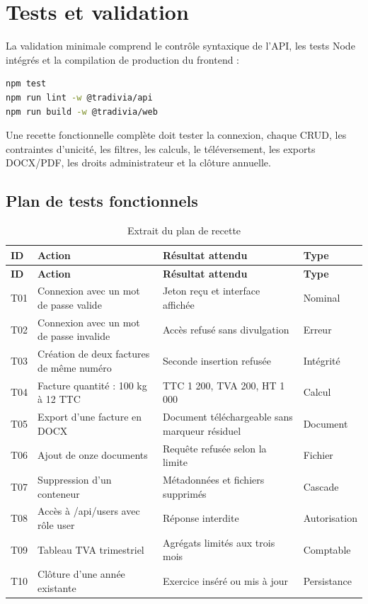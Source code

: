 \documentclass[12pt,a4paper,oneside]{report}
\begin{document}
\section{Tests et validation}
La validation minimale comprend le contrôle syntaxique de l'API, les tests Node intégrés et la compilation de production du frontend :
\begin{lstlisting}[language=bash,caption={Commandes de validation}]
npm test
npm run lint -w @tradivia/api
npm run build -w @tradivia/web
\end{lstlisting}
Une recette fonctionnelle complète doit tester la connexion, chaque CRUD, les contraintes d'unicité, les filtres, les calculs, le téléversement, les exports DOCX/PDF, les droits administrateur et la clôture annuelle.

\subsection{Plan de tests fonctionnels}
\begin{longtable}{p{1.5cm}p{5.3cm}p{5.4cm}p{2cm}}
\caption{Extrait du plan de recette}\label{tab:tests}\\
\toprule \textbf{ID} & \textbf{Action} & \textbf{Résultat attendu} & \textbf{Type}\\ \midrule
\endfirsthead
\toprule \textbf{ID} & \textbf{Action} & \textbf{Résultat attendu} & \textbf{Type}\\ \midrule
\endhead
T01 & Connexion avec un mot de passe valide & Jeton reçu et interface affichée & Nominal\\
T02 & Connexion avec un mot de passe invalide & Accès refusé sans divulgation & Erreur\\
T03 & Création de deux factures de même numéro & Seconde insertion refusée & Intégrité\\
T04 & Facture quantité : 100 kg à 12 TTC & TTC 1 200, TVA 200, HT 1 000 & Calcul\\
T05 & Export d'une facture en DOCX & Document téléchargeable sans marqueur résiduel & Document\\
T06 & Ajout de onze documents & Requête refusée selon la limite & Fichier\\
T07 & Suppression d'un conteneur & Métadonnées et fichiers supprimés & Cascade\\
T08 & Accès à /api/users avec rôle user & Réponse interdite & Autorisation\\
T09 & Tableau TVA trimestriel & Agrégats limités aux trois mois & Comptable\\
T10 & Clôture d'une année existante & Exercice inséré ou mis à jour & Persistance\\
\bottomrule
\end{longtable}
\end{document}
